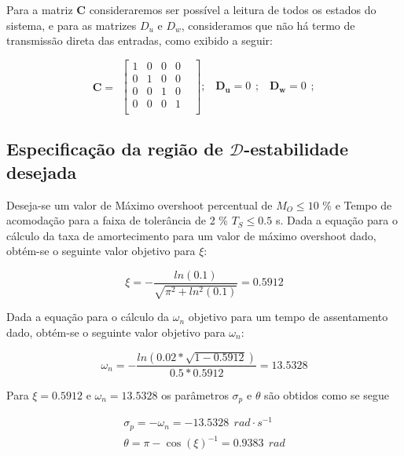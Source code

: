 Para a matriz $\mathbf{C}$ consideraremos ser possível a leitura de todos os estados do sistema, e para as matrizes $D_u$ e $D_w$, consideramos que não há termo de transmissão direta das entradas, como exibido a seguir:

\begin{equation} \label{eq:matriz_c}
    \begin{split}
        \mathbf{C}=
    \end{split}
    \begin{bmatrix}
        1&0&0&0&\\
        0&1&0&0&\\
        0&0&1&0&\\
        0&0&0&1&\\
    \end{bmatrix};\ \
    \begin{split}
        \mathbf{D_u} = 0
    \end{split};\ \
    \begin{split}
        \mathbf{D_w} = 0
    \end{split};\ \ 
\end{equation}

\subsection{Especificação da região de \( \mathcal{D}\)-estabilidade desejada}

Deseja-se um valor de Máximo overshoot percentual de $M_O \leq 10$ \% e Tempo de acomodação para a faixa de tolerância de 2 \% $T_S \leq 0.5$ s. 
Dada a equação para o cálculo da taxa de amortecimento para um valor de máximo overshoot dado, obtém-se o seguinte valor objetivo para $\xi$:

\begin{equation*}
    \xi=-\frac{ln\left(0.1\right)}{\sqrt{\pi^2+ln^2(0.1)}}=0.5912
\end{equation*}

Dada a equação para o cálculo da $\omega_n$ objetivo para um tempo de assentamento dado, obtém-se o seguinte valor objetivo para $\omega_n$:

\begin{equation*}
    \omega_n=-\frac{ln\left( 0.02*\sqrt{1-0.5912} \right)}{0.5*0.5912}=13.5328
\end{equation*}

Para $\xi=0.5912$ e $\omega_n=13.5328$ os parâmetros $\sigma_p$ e $\theta$ são obtidos como se segue

\begin{equation*}
    \begin{split}
       \sigma_p=-\omega_n=-13.5328\ \ rad\cdot s^{-1}\\
       \theta=\pi-\cos{(\xi)}^{-1}=0.9383\ \ rad\\    
    \end{split}
\end{equation*}
